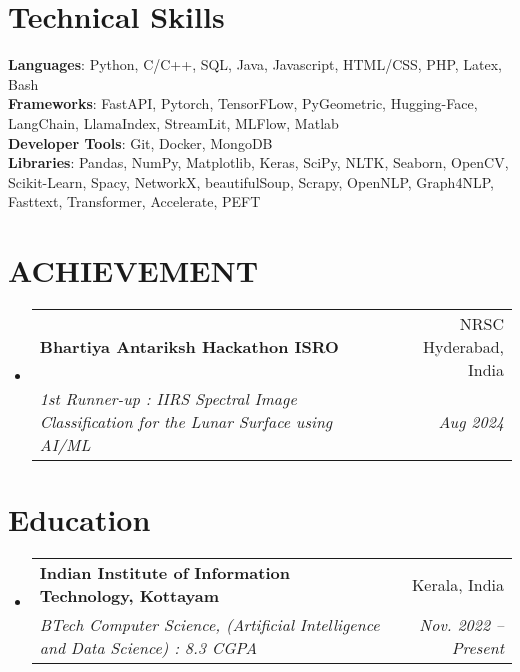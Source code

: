\documentclass[letterpaper,11pt]{article}
\makeatletter
\newcommand{\resumeSubheading}[4]{
  \vspace{-2pt}\item
    \begin{tabular*}{0.97\textwidth}[t]{l@{\extracolsep{\fill}}r}
      \textbf{#1} & #2 \\
      \textit{\small#3} & \textit{\small #4} \\
    \end{tabular*}\vspace{-7pt}
}
\newcommand{\resumeSubHeadingListStart}{\begin{itemize}[leftmargin=0.15in, label={}]}
\newcommand{\resumeSubHeadingListEnd}{\end{itemize}}
\makeatother
\begin{document}
%
\section{Technical Skills}
 \begin{itemize}[leftmargin=0.15in, label={}]
    \small{\item{
     \textbf{Languages}{: Python, C/C++, SQL, Java, Javascript, HTML/CSS, PHP, Latex, Bash} \\
     \textbf{Frameworks}{: FastAPI, Pytorch, TensorFLow, PyGeometric, Hugging-Face, LangChain, LlamaIndex, StreamLit, MLFlow, Matlab} \\
     \textbf{Developer Tools}{: Git, Docker, MongoDB} \\
     \textbf{Libraries}{: Pandas, NumPy, Matplotlib, Keras, SciPy, NLTK, Seaborn, OpenCV, Scikit-Learn, Spacy, NetworkX, beautifulSoup, Scrapy, OpenNLP, Graph4NLP, Fasttext, Transformer, Accelerate, PEFT}
    }}
 \end{itemize}


\section{ACHIEVEMENT}
  \resumeSubHeadingListStart
    \resumeSubheading
      {Bhartiya Antariksh Hackathon ISRO}{NRSC Hyderabad, India}
      {1st Runner-up : IIRS Spectral Image Classification for the Lunar Surface using AI/ML}{Aug 2024}
  \resumeSubHeadingListEnd


\section{Education}
  \resumeSubHeadingListStart
    \resumeSubheading
      {Indian Institute of Information Technology, Kottayam}{Kerala, India}
      {BTech Computer Science, (Artificial Intelligence and Data Science) : 8.3 CGPA}{Nov. 2022 -- Present}
  \resumeSubHeadingListEnd

\end{document}
